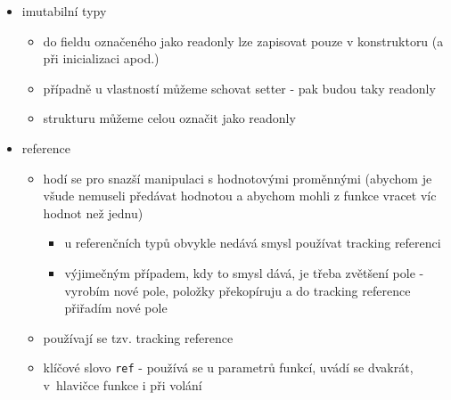 \begin{itemize}
\begin{itemize}
\begin{itemize}
\item při takovém přiřazení se provádí boxing - je to implicitní alokace na GC haldě, alokuje se tam instance hodnotového typu (bude tam standardní overhead)
\begin{itemize}
\item pozor: v Javě jsou dva různé typy, int (hodnotový) a Integer (referenční) - v C\# je to ten samý typ System.Int32
\end{itemize}
\item co můžu dělat s proměnnou typu object?
\begin{itemize}
\item můžu volat ToString()
\end{itemize}
\item unboxing - hodnotový typ alokovaný na haldě uložený referencí se uloží jako hodnota
\item není vhodné používat object pro slabé typování - vlastně takhle implementujeme duck typing
\item když potřebujeme hodnotový typ předávat referencí, tak object nedává smysl, vhodnější je použít jednoduchou třídu
\end{itemize}
\item imutabilní typy
\begin{itemize}
\item do fieldu označeného jako readonly lze zapisovat pouze v konstruktoru (a při inicializaci apod.)
\item případně u vlastností můžeme schovat setter - pak budou taky readonly
\item strukturu můžeme celou označit jako readonly
\end{itemize}
\item reference
\begin{itemize}
\item hodí se pro snazší manipulaci s hodnotovými proměnnými (abychom je všude nemuseli předávat hodnotou a abychom mohli z funkce vracet víc hodnot než jednu)
\begin{itemize}
\item u referenčních typů obvykle nedává smysl používat tracking referenci
\item výjimečným případem, kdy to smysl dává, je třeba zvětšení pole - vyrobím nové pole, položky překopíruju a do tracking reference přiřadím nové pole
\end{itemize}
\item používají se tzv. tracking reference
\item klíčové slovo \texttt{ref} - používá se u parametrů funkcí, uvádí se dvakrát, v~hlavičce funkce i při volání

\end{itemize}
\end{itemize}
\end{itemize}
